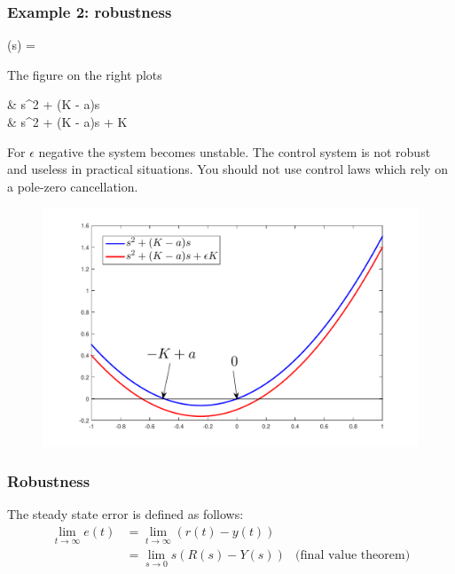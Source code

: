 \begin{frame}
	\frametitle{Example 2: robustness}
	\begin{minipage}{0.5\linewidth}
		\begin{flalign*}
			(s) = 
		\end{flalign*}
		The figure on the right plots
		\begin{flalign*}
			&{\color{blue} s^2 + (K - a)s} \\
			&{\color{red} s^2 + (K - a)s + \epsilon K}
		\end{flalign*}
		For $\epsilon$ negative the system becomes unstable. The control system is not robust and useless in practical situations. You should not use control laws which rely on a pole-zero cancellation. 
	\end{minipage}
	\begin{minipage}{0.4\linewidth}
		\begin{figure}
			\center
			\includegraphics[width=1.5\linewidth]{robustnessexample}
			\label{fig:robustness-example}
		\end{figure}
	\end{minipage}
\end{frame}


\begin{frame}
	\frametitle{Robustness}
	\begin{definition}
		The steady state error is defined as follows:
		\begin{align*}
			\lim\limits_{t \rightarrow \infty} e(t)
			&= \lim\limits_{t \rightarrow \infty} (r(t) - y(t)) \\
			&= \lim\limits_{s \rightarrow 0} s(R(s) - Y(s)) &\text{(final value theorem)}
		\end{align*}
	\end{definition}
\end{frame}


